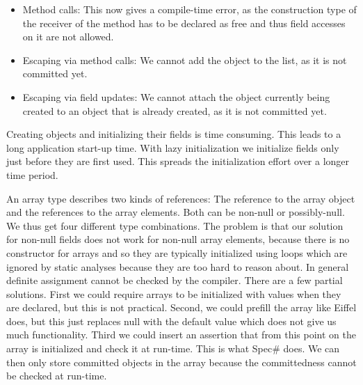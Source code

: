\begin{mytitle}\hfill
\begin{itemize}
    \item Method calls: This now gives a compile-time error, as the construction type of the receiver of the method has to be declared as free and thus field accesses on it are not allowed.
    \item Escaping via method calls: We cannot add the object to the list, as it is not committed yet.
    \item Escaping via field updates: We cannot attach the object currently being created to an object that is already created, as it is not committed yet.
\end{itemize}
\end{mytitle}
\begin{mytitle} Creating objects and initializing their fields is time consuming. This leads to a long application start-up time. With lazy initialization we initialize fields only just before they are first used. This spreads the initialization effort over a longer time period.
\end{mytitle}
\begin{mytitle} An array type describes two kinds of references: The reference to the array object and the references to the array elements. Both can be non-null or possibly-null. We thus get four different type combinations. The problem is that our solution for non-null fields does not work for non-null array elements, because there is no constructor for arrays and so they are typically initialized using loops which are ignored by static analyses because they are too hard to reason about. In general definite assignment cannot be checked by the compiler. There are a few partial solutions. First we could require arrays to be initialized with values when they are declared, but this is not practical. Second, we could prefill the array like Eiffel does, but this just replaces null with the default value which does not give us much functionality. Third we could insert an assertion that from this point on the array is initialized and check it at run-time. This is what Spec\# does. We can then only store committed objects in the array because the committedness cannot be checked at run-time. 
\end{mytitle}
